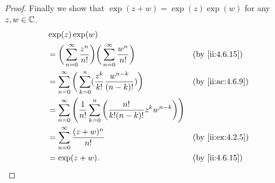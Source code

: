 \begin{proof}
  Finally we show that \(\exp(z + w) = \exp(z) \exp(w)\) for any \(z, w \in \mathbb{C}\).
  \begin{align*}
     & \exp(z) \exp(w)                                                                                                                        \\
     & = \bigg(\sum_{n = 0}^\infty \dfrac{z^n}{n!}\bigg) \bigg(\sum_{n = 0}^\infty \dfrac{w^n}{n!}\bigg)                &  & \by{ii:4.6.15}   \\
     & = \sum_{n = 0}^\infty \bigg(\sum_{k = 0}^n (\dfrac{z^k}{k!} \dfrac{w^{n - k}}{(n - k)!})\bigg)                   &  & \by{ii:ac:4.6.9} \\
     & = \sum_{n = 0}^\infty \Bigg(\dfrac{1}{n!} \sum_{k = 0}^n \bigg(\dfrac{n!}{k! (n - k)!} z^k w^{n - k}\bigg)\Bigg)                       \\
     & = \sum_{n = 0}^\infty \dfrac{(z + w)^n}{n!}                                                                      &  & \by{ii:ex:4.2.5} \\
     & = \exp(z + w).                                                                                                   &  & \by{ii:4.6.15}
  \end{align*}
\end{proof}
